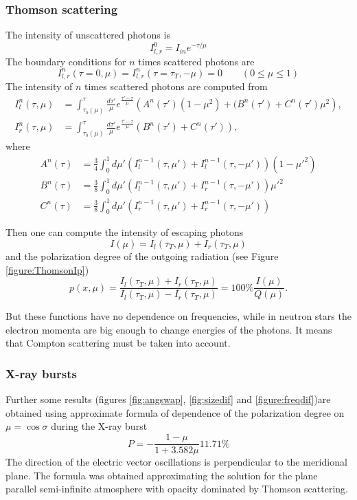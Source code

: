 \documentclass{aa}
\newcommand{\be}{\begin{equation}}
\newcommand{\ee}{\end{equation}}
\newcommand{\red}[1]{\textcolor{red}{#1}}
\begin{document}
\subsubsection{Thomson scattering}
The intensity of unscattered photons is
\begin{equation}
I_{l,r}^0=I_{in}e^{-\tau/\mu}
\end{equation} The boundary conditions for $n$ times scattered photons are
\be
I_{l,r}^n(\tau=0,\mu)=I_{l,r}^n(\tau=\tau_T,-\mu)=0\qquad (0\leq\mu\leq1)
\ee
The intensity of $n$ times scattered photons are computed from
\begin{align}
I_l^n(\tau,\mu)&=\int_{\tau_b(\mu)}^\tau \frac{d\tau'}\mu e^{\frac{\tau'-\tau}\mu}
\left( A^n(\tau')(1-\mu^2) + (B^n(\tau')+C^n(\tau')\mu^2 \right),\nonumber\\
I_r^n(\tau,\mu)&=\int_{\tau_b(\mu)}^\tau \frac{d\tau'}\mu e^{\frac{\tau'-\tau}\mu}
\left(B^n(\tau')+C^n(\tau')\right),
\end{align}
where 
\begin{align}
A^n(\tau)&=\frac34\int_0^1 d\mu' (I^{n-1}_l (\tau,\mu')+I^{n-1}_l (\tau,-\mu')) (1-\mu'^2) \nonumber\\
B^n(\tau)&=\frac38\int_0^1 d\mu' (I^{n-1}_l (\tau,\mu')+I^{n-1}_r (\tau,-\mu'))\mu'^2 \\
C^n(\tau)&=\frac38\int_0^1 d\mu' (I^{n-1}_r (\tau,\mu')+I^{n-1}_r (\tau,-\mu')) \nonumber
\end{align}

Then one can compute the intensity of escaping photons\be
I(\mu)=I_l(\tau_T,\mu)+I_r(\tau_T,\mu)
\ee
and the polarization degree of the outgoing radiation (see Figure \ref{figure:ThomsonIp})
\be
p(x,\mu)
=\frac{I_l(\tau_T,\mu)+I_r(\tau_T,\mu)}{I_l(\tau_T,\mu)-I_r(\tau_T,\mu)}
=100\%\frac{I(\mu)}{Q(\mu)}.\ee



But these functions have no dependence on frequencies, while in neutron stars the electron momenta are big enough to change energies of the photons. It means that Compton scattering must be taken into account.



\subsubsection{X-ray bursts}
Further some results (figures \ref{fig:angswap}, \ref{fig:sizedif} and \ref{figure:freqdif})are obtained using approximate formula of dependence of the polarization degree on $\mu=\cos{\sigma}$  during the X-ray burst
\be
P=-\frac{1-\mu}{1+3.582\mu}11.71\%
\ee
The direction of the electric vector oscillations is perpendicular to the meridional plane.
The formula was obtained approximating the solution for the plane parallel semi-infinite atmosphere with opacity dominated by Thomson scattering.
\end{document}
